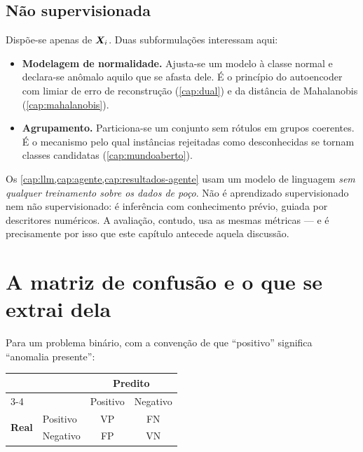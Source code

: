 \subsection{Não supervisionada}

Dispõe-se apenas de $\bm{X}_i$. Duas subformulações interessam aqui:

\begin{itemize}[leftmargin=*,itemsep=0.35em]
  \item \textbf{Modelagem de normalidade.} Ajusta-se um modelo à classe normal e
        declara-se anômalo aquilo que se afasta dele. É o princípio do autoencoder com
        limiar de erro de reconstrução (\cref{cap:dual}) e da distância de Mahalanobis
        (\cref{cap:mahalanobis}).
  \item \textbf{Agrupamento.} Particiona-se um conjunto sem rótulos em grupos
        coerentes. É o mecanismo pelo qual instâncias rejeitadas como desconhecidas se
        tornam classes candidatas (\cref{cap:mundoaberto}).
\end{itemize}

\begin{destaque}
Os \cref{cap:llm,cap:agente,cap:resultados-agente} usam um modelo de linguagem
\emph{sem qualquer treinamento sobre os dados de poço}. Não é aprendizado
supervisionado nem não supervisionado: é inferência com conhecimento prévio, guiada por
descritores numéricos. A avaliação, contudo, usa as mesmas métricas --- e é
precisamente por isso que este capítulo antecede aquela discussão.
\end{destaque}

\section{A matriz de confusão e o que se extrai dela}

Para um problema binário, com a convenção de que ``positivo'' significa ``anomalia
presente'':

\begin{center}
\small
\begin{tabular}{ll cc}
\toprule
& & \multicolumn{2}{c}{\textbf{Predito}} \\
\cmidrule(l){3-4}
& & Positivo & Negativo \\
\midrule
\multirow{2}{*}{\textbf{Real}}
& Positivo & VP & FN \\
& Negativo & FP & VN \\
\bottomrule
\end{tabular}
\end{center}

